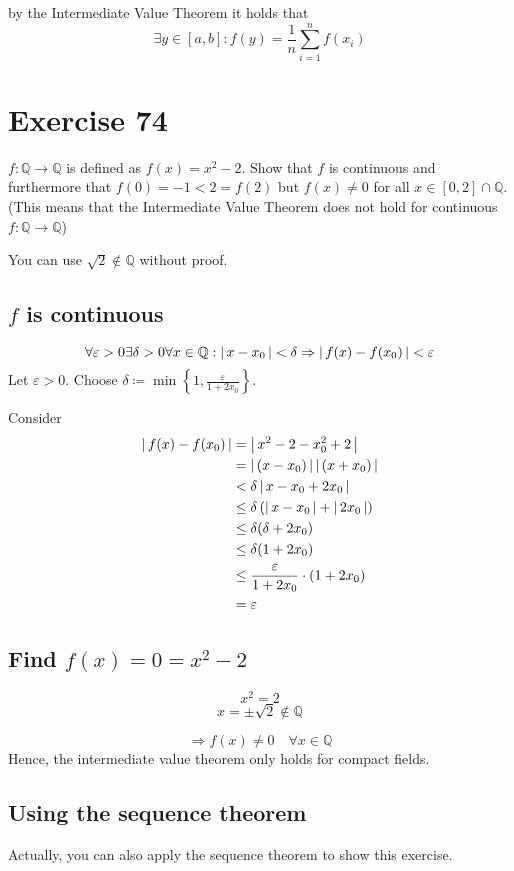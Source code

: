 \documentclass[a4paper]{article}
\theoremstyle{definition}
\newcommand\abs[1]{\left|\thinspace #1\thinspace\right|}
\newcommand\set[1]{\left\{#1\right\}}
\begin{document}
by the Intermediate Value Theorem it holds that
\[ \exists y \in [a,b]: f(y) = \frac1n \sum_{i=1}^n f(x_i) \]

\section{Exercise 74}
\begin{ex}
  $f: \mathbb Q \to \mathbb Q$ is defined as $f(x) = x^2 - 2$. Show that $f$ is continuous and furthermore
  that $f(0) = -1 < 2 = f(2)$ but $f(x) \neq 0$ for all $x \in [0,2] \cap \mathbb Q$.
  (This means that the Intermediate Value Theorem does not hold for continuous $f: \mathbb Q \to \mathbb Q$)

  You can use $\sqrt{2} \not\in \mathbb Q$ without proof.
\end{ex}

\subsection{$f$ is continuous}
\[ \forall \varepsilon > 0 \exists \delta > 0 \forall x \in \mathbb Q: \abs{x - x_0} < \delta \Rightarrow \abs{f(x) - f(x_0)} < \varepsilon \]
Let $\varepsilon > 0$. Choose $\delta \coloneqq \min\set{1, \frac{\varepsilon}{1 + 2x_0}}$.

Consider
\begin{align*}
  \abs{f(x) - f(x_0)}
    &= \abs{x^2 - 2 - x_0^2 + 2} \\
    &= \abs{(x - x_0)} \abs{(x + x_0)} \\
    &< \delta \abs{x - x_0 + 2x_0} \\
    &\leq \delta \left(\abs{x - x_0} + \abs{2x_0}\right) \\
    &\leq \delta(\delta + 2x_0) \\
    &\leq \delta(1 + 2x_0) \\
    &\leq \frac{\varepsilon}{1 + 2x_0} \cdot (1 + 2x_0) \\
    &= \varepsilon
\end{align*}

\subsection{Find $f(x) = 0 = x^2 - 2$}
%
\[ x^2 = 2 \]
\[ x = \pm \sqrt{2} \not\in \mathbb Q \]

\[ \Rightarrow f(x) \neq 0 \quad \forall x \in \mathbb Q \]
Hence, the intermediate value theorem only holds for compact fields.

\subsection{Using the sequence theorem}
%
Actually, you can also apply the sequence theorem to show this exercise.
\end{document}

